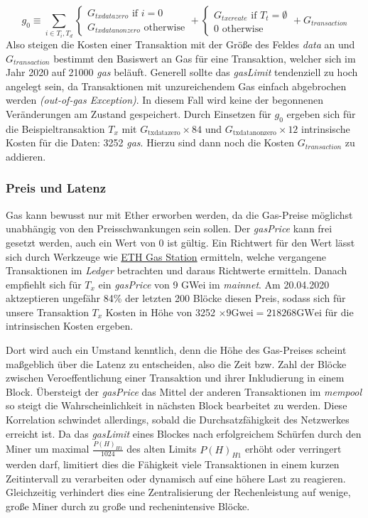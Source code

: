 \documentclass[runningheads]{llncs}
\begin{document}
$$ g_0 \equiv \sum_{i \in T_i, T_d}
  \begin{cases}
    G_{txdatazero} \text{ if } i=0 \\
    G_{txdatanonzero} \text{ otherwise}
  \end{cases}
  +
  \begin{cases}
    G_{txcreate} \text{ if } T_t = \emptyset \\
    0 \text{ otherwise}
  \end{cases}
  +
  G_{transaction}
$$
Also steigen die Kosten einer Transaktion mit der Größe des Feldes \textit{data} an und $ G_{transaction} $ bestimmt den Basiswert an Gas für eine Transaktion, welcher sich im Jahr 2020 auf 21000 \textit{gas} beläuft. Generell sollte das \textit{gasLimit} tendenziell zu hoch angelegt sein, da Transaktionen mit unzureichendem Gas einfach abgebrochen werden \textit{(out-of-gas Exception)}. In diesem Fall wird keine der begonnenen Veränderungen am Zustand gespeichert. Durch Einsetzen für $ g_0 $ ergeben sich für die Beispieltransaktion $ T_x $ mit $ G_{\text{txdatazero}} \times 84 $ und $ G_{\text{txdatanonzero}} \times 12 $ intrinsische Kosten für die Daten: 3252 \textit{gas}. Hierzu sind dann noch die Kosten $ G_{transaction} $ zu addieren. \cite{neemann_appendix_nodate}

\subsubsection{Preis und Latenz}
Gas kann bewusst nur mit Ether erworben werden, da die Gas-Preise möglichst unabhängig von den Preisschwankungen sein sollen. Der \textit{gasPrice} kann frei gesetzt werden, auch ein Wert von 0 ist gültig. Ein Richtwert für den Wert lässt sich durch Werkzeuge wie \href{https://www.ethgasstation.info/}{ETH Gas Station} ermitteln, welche vergangene Transaktionen im \textit{Ledger} betrachten und daraus Richtwerte ermitteln. Danach empfiehlt sich für $ T_x $ ein \textit{gasPrice} von 9 GWei im \textit{mainnet}. Am 20.04.2020 aktzeptieren ungefähr 84\% der letzten 200 Blöcke diesen Preis, sodass sich für unsere Transaktion $ T_x $ Kosten in Höhe von 3252 $ \times 9 \text{Gwei} = 218268 \text{GWei} $ für die intrinsischen Kosten ergeben.

Dort wird auch ein Umstand kenntlich, denn die Höhe des Gas-Preises scheint maßgeblich über die Latenz zu entscheiden, also die Zeit bzw. Zahl der Blöcke zwischen Veroeffentlichung einer Transaktion und ihrer Inkludierung in einem Block. Übersteigt der \textit{gasPrice} das Mittel der anderen Transaktionen im \textit{mempool} so steigt die Wahrscheinlichkeit in nächsten Block bearbeitet zu werden. Diese Korrelation schwindet allerdings, sobald die Durchsatzfähigkeit des Netzwerkes erreicht ist. \cite[S. 30 f.]{pierro_influence_2019} Da das \textit{gasLimit} eines Blockes nach erfolgreichem Schürfen durch den Miner um maximal $ \frac{P(H)_{H1}}{1024} $ des alten Limits  $ P(H)_{H1} $ erhöht oder verringert werden darf, limitiert dies die Fähigkeit viele Transaktionen in einem kurzen Zeitintervall zu verarbeiten oder dynamisch auf eine höhere Last zu reagieren. Gleichzeitig  verhindert dies eine Zentralisierung der Rechenleistung auf wenige, große Miner durch zu große und rechenintensive Blöcke.
\end{document}
